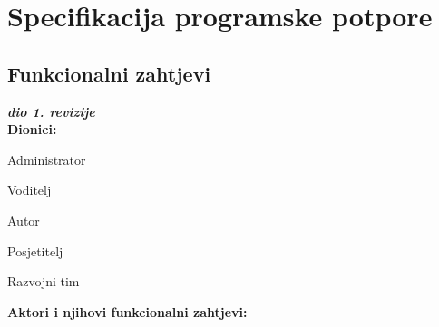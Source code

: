 \chapter{Specifikacija programske potpore}
		
	\section{Funkcionalni zahtjevi}
			
			\textbf{\textit{dio 1. revizije}}\\
			
			\noindent \textbf{Dionici:}
			
			\begin{packed_enum}
				
				\item Administrator
				\item Voditelj			
				\item Autor
				\item Posjetitelj
				\item Razvojni tim
				
			\end{packed_enum}
			
			\noindent \textbf{Aktori i njihovi funkcionalni zahtjevi:}
			
